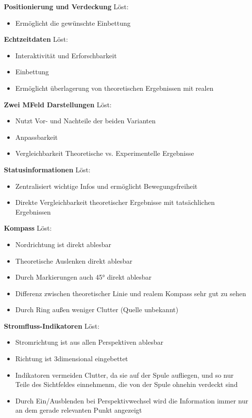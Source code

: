 \textbf{Positionierung und Verdeckung}
Löst:
\begin{itemize}
	\item Ermöglicht die gewünschte Einbettung
\end{itemize}

\textbf{Echtzeitdaten}
Löst:
\begin{itemize}
	\item Interaktivität und Erforschbarkeit
	\item Einbettung
	\item Ermöglicht überlagerung von theoretischen Ergebnissen mit realen
\end{itemize}

\textbf{Zwei MFeld Darstellungen}
Löst: 
\begin{itemize}
	\item Nutzt Vor- und Nachteile der beiden Varianten
	\item Anpassbarkeit
	\item Vergleichbarkeit Theoretische vs. Experimentelle Ergebnisse
\end{itemize}

\textbf{Statusinformationen}
Löst: 
\begin{itemize}
	\item Zentralisiert wichtige Infos und ermöglicht Bewegungsfreiheit
	\item Direkte Vergleichbarkeit theoretischer Ergebnisse mit tatsächlichen Ergebnissen
\end{itemize}

\textbf{Kompass}
Löst: 
\begin{itemize}
	\item Nordrichtung ist direkt ablesbar
	\item Theoretische Auslenken direkt ablesbar
	\item Durch Markierungen auch 45° direkt ablesbar
	\item Differenz zwischen theoretischer Linie und realem Kompass sehr gut zu sehen
	\item Durch Ring außen weniger Clutter (Quelle unbekannt)
\end{itemize}

\textbf{Stromfluss-Indikatoren}
Löst: 
\begin{itemize}
	\item Stromrichtung ist aus allen Perspektiven ablesbar
	\item Richtung ist 3dimensional eingebettet
	\item Indikatoren vermeiden Clutter, da sie auf der Spule aufliegen, und so nur Teile des Sichtfeldes einnehmenm, die von der Spule ohnehin verdeckt sind
	\item Durch Ein/Ausblenden bei Perspektivwechsel wird die Information immer nur an dem gerade relevanten Punkt angezeigt
\end{itemize}

